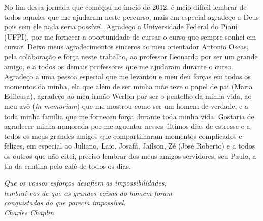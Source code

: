 \documentclass[
	12pt,				%
    oneside,			%
	a4paper,			%
	english,			%
	french,				%
	spanish,			%
	brazil,				%
	]{abntex2}
\begin{document}
\frenchspacing 


\imprimircapa

\imprimirfolhaderosto*

 \begin{fichacatalografica}
	
\end{fichacatalografica}

\begin{folhadeaprovacao}
	
\end{folhadeaprovacao}
\begin{agradecimentos}
	No fim dessa jornada que começou no início de 2012, é meio difícil lembrar de todos aqueles que me ajudaram neste percurso, mais em especial agradeço a Deus pois sem ele nada seria possível. Agradeço a Universidade Federal do Piauí (UFPI), por me fornecer a oportunidade de cursar o curso que sempre sonhei em cursar. Deixo meus agradecimentos sinceros ao meu orientador Antonio Oseas, pela colaboração e força neste trabalho, ao professor Leonardo por ser um grande amigo, e a todos os demais professores que me ajudaram durante o curso. 
	Agradeço a uma pessoa especial que me levantou e meu deu forças em todos os momentos da minha, ela que além de ser minha mãe teve o papel de pai (Maria Edileusa), agradeço ao meu irmão Werlon por ser o pentelho da minha vida, ao meu avô (\textit{in memoriam}) que me mostrou como ser um homem de verdade, e a toda minha família que me forneceu força durante toda minha vida. Gostaria de agradecer minha namorada por me aguentar nesses últimos dias de estresse e a todos os meus grandes amigos que compartilharam momentos complicados e felizes, em especial ao Juliano, Laio, Josafá, Jaílson, Zé (José Roberto) e a todos os outros que não citei, preciso lembrar dos meus amigos servidores, seu Paulo, a tia da cantina pelo café de todos os dias. 
		
\end{agradecimentos}

\begin{epigrafe}
	\vspace*{\fill}
	\begin{flushright}
		\textit{Que os vossos esforços desafiem as impossibilidades,\\ 
				lembrai-vos de que as grandes coisas do homem foram \\
				conquistadas do que parecia impossível.\\
			Charles Chaplin}
	\end{flushright}
\end{epigrafe}
\pagebreak
\end{document}
